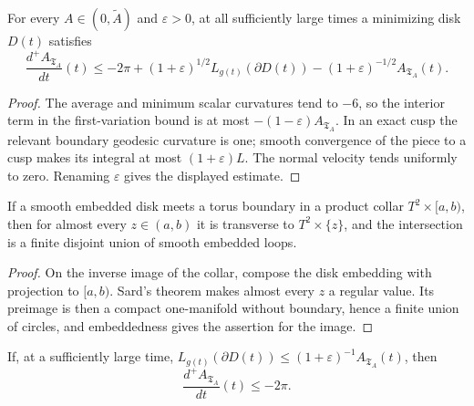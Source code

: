 \begin{lemma}
\label{lem:chow-iv-minimizing-disk-evolution}
For every \(A\in(0,\widetilde A)\) and \(\varepsilon>0\), at all sufficiently
large times a minimizing disk \(D(t)\) satisfies
\[
 \frac{d^+A_{\mathfrak T_A}}{dt}(t)\le-2\pi
 +(1+\varepsilon)^{1/2}L_{g(t)}(\partial D(t))
 -(1+\varepsilon)^{-1/2}A_{\mathfrak T_A}(t).
\]
\end{lemma}

\begin{proof}
The average and minimum scalar curvatures tend to \(-6\), so the interior term
in the first-variation bound is at most
\(-(1-\varepsilon)A_{\mathfrak T_A}\).  In an exact cusp the relevant boundary
geodesic curvature is one; smooth convergence of the piece to a cusp makes its
integral at most \((1+\varepsilon)L\).  The normal velocity tends uniformly to
zero.  Renaming \(\varepsilon\) gives the displayed estimate.
\end{proof}

\begin{lemma}
\label{lem:chow-iv-disk-torus-slice-transversality}
If a smooth embedded disk meets a torus boundary in a product collar
\(T^2\times[a,b)\), then for almost every \(z\in(a,b)\) it is transverse to
\(T^2\times\{z\}\), and the intersection is a finite disjoint union of smooth
embedded loops.
\end{lemma}

\begin{proof}
On the inverse image of the collar, compose the disk embedding with projection
to \([a,b)\).  Sard's theorem makes almost every \(z\) a regular value.  Its
preimage is then a compact one-manifold without boundary, hence a finite union
of circles, and embeddedness gives the assertion for the image.
\end{proof}

\begin{lemma}
\label{lem:chow-iv-area-decay-short-boundary}
If, at a sufficiently large time,
\(L_{g(t)}(\partial D(t))\le(1+\varepsilon)^{-1}A_{\mathfrak T_A}(t)\), then
\[
 \frac{d^+A_{\mathfrak T_A}}{dt}(t)\le-2\pi.
\]
\end{lemma}


